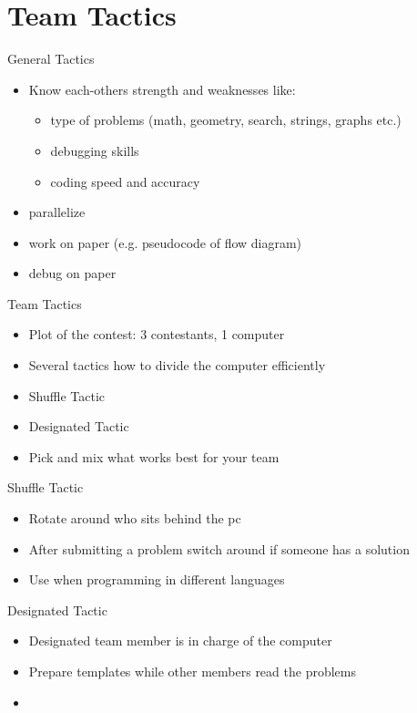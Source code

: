 \documentclass[11pt,pdf, aspectratio=169]{beamer}
\begin{document}
  \section{Team Tactics}
  \begin{frame}{General Tactics}
    \begin{itemize}
      \item Know each-others strength and weaknesses like:
      \begin{itemize}
        \item type of problems (math, geometry, search, strings, graphs etc.)
        \item debugging skills
        \item coding speed and accuracy
      \end{itemize}
      \item parallelize
      \item work on paper (e.g. pseudocode of flow diagram)
      \item debug on paper
    \end{itemize}
  \end{frame}
  \begin{frame}{Team Tactics}
    \begin{itemize}
      \item<1-> Plot of the contest: 3 contestants, 1 computer
      \item<2-> Several tactics how to divide the computer efficiently
      \item<3-> Shuffle Tactic
      \item<3-> Designated Tactic
      \item<3-> Pick and mix what works best for your team
    \end{itemize}
  \end{frame}
  \begin{frame}{Shuffle Tactic}
    \begin{itemize}
      \item Rotate around who sits behind the pc
      \item After submitting a problem switch around if someone has a solution
      \item Use when programming in different languages
    \end{itemize}
  \end{frame}
  \begin{frame}{Designated Tactic}
    \begin{itemize}
      \item Designated team member is in charge of the computer
      \item Prepare templates while other members read the problems
      \item 
    \end{itemize}
  \end{frame}
\end{document}
